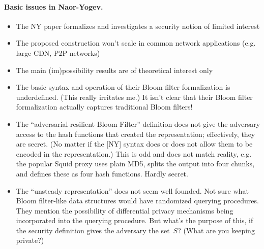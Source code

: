 \paragraph{Basic issues in Naor-Yogev. }
\begin{itemize}
\item The NY paper formalizes and investigates a security notion of limited interest
\item The proposed construction won't scale in common network applications (e.g. large CDN, P2P networks)
\item The main (im)possibility results are of theoretical interest only
\item The basic syntax and operation of their Bloom filter formalization is underdefined.  (This really irritates me.)  It isn’t clear that their Bloom filter formalization actually captures traditional Bloom filters!  
\item The ``adversarial-resilient Bloom Filter'' definition does not give the adversary access to the hash functions that created the representation; effectively, they are secret. (No matter if the [NY] syntax does or does not allow them to be encoded in the representation.)  This is odd and does not match reality, e.g. the popular Squid proxy uses plain MD5, splits the output into four chunks, and defines these as four hash functions.  Hardly secret. 
\item The ``unsteady representation'' does not seem well founded.  Not sure what Bloom filter-like data structures would have randomized querying procedures.  They mention the possibility of differential privacy mechanisms being incorporated into the querying procedure.  But what's the purpose of this, if the security definition gives the adversary the set~$S$?  (What are you keeping private?)
\end{itemize}

